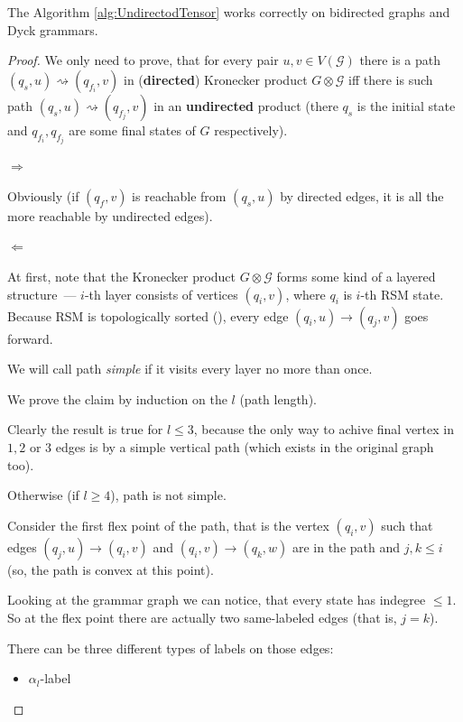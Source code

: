\begin{theorem}
The Algorithm \ref{alg:UndirectodTensor} works correctly on bidirected graphs and Dyck grammars.
\end{theorem}
\begin{proof}

We only need to prove, that for every pair $u, v \in V(\mathcal{G})$ there is a path $(q_s, u) \rightsquigarrow (q_{f_i}, v)$ in ({\bf directed}) Kronecker product $G \otimes \mathcal{G}$ 
iff 
there is such path $(q_s, u) \rightsquigarrow (q_{f_j}, v)$ in an {\bf undirected} product (there $q_s$ is the initial state and $q_{f_i}, q_{f_j}$ are some final states of $G$ respectively).

$\Rightarrow$ 

Obviously (if $(q_{f}, v)$ is reachable from $(q_{s}, u)$ by directed edges, it is all the more reachable by undirected edges).

$\Leftarrow$

At first, note that the Kronecker product $G \otimes \mathcal{G}$ forms some kind of a layered structure~--- $i$-th layer consists of vertices $(q_i, v)$, where $q_i$ is $i$-th RSM state. Because RSM is topologically sorted ({\color{red}{TODO}}), every edge $(q_i, u) \rightarrow (q_j, v)$ goes forward.

We will call path \textit{simple} if it visits every layer no more than once.

We prove the claim by induction on the $l$ (path length).

Clearly the result is true for $l \le 3$, because the only way to achive final vertex in $1, 2$ or $3$ edges is by a simple vertical path (which exists in the original graph too).

Otherwise (if $l \ge 4$), path is not simple. 

Consider the first flex point of the path, that is the vertex $(q_i, v)$ such that edges $(q_j, u) \rightarrow (q_i, v)$ and $(q_i, v) \rightarrow (q_k, w)$ are in the path and $j, k \le i$ (so, the path is convex at this point).

Looking at the grammar graph we can notice, that every state has indegree $\le 1$. So at the flex point there are actually two same-labeled edges (that is, $j = k$). 

There can be three different types of labels on those edges:

\begin{itemize}
    \item $\alpha_l$-label


\end{itemize}
\end{proof}
